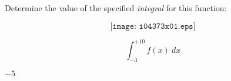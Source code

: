 

Determine the value of the specified {\it integral} for this function:

$$\texttt{[image: i04373x01.eps]}$$

$$\int_{-3}^{+10} f(x) \> dx$$







$-5$











